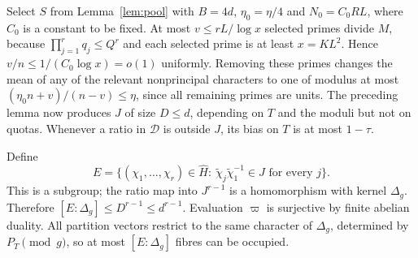 \documentclass[11pt]{article}
\theoremstyle{remark}\newtheorem{remark}[theorem]{Remark}
\begin{document}
Select $S$ from Lemma~\ref{lem:pool} with $B=4d$, $\eta_0=\eta/4$ and $N_0=C_0RL$, where $C_0$ is a constant to be fixed. At most $v\le r L/\log x$ selected primes divide $M$, because $\prod_{j=1}^r q_j\le Q^r$ and each selected prime is at least $x=KL^2$. Hence $v/n\le1/(C_0\log x)=o(1)$ uniformly. Removing these primes changes the mean of any of the relevant nonprincipal characters to one of modulus at most $(\eta_0 n+v)/(n-v)\le\eta$, since all remaining primes are units. The preceding lemma now produces $J$ of size $D\le d$, depending on $T$ and the moduli but not on quotas. Whenever a ratio in $\mathcal D$ is outside $J$, its bias on $T$ is at most $1-\tau$.

Define
\begin{equation}\label{eq:E}
E=\{(\chi_1,\ldots,\chi_r)\in\widehat H:\ 
\widetilde\chi_j\widetilde\chi_1^{-1}\in J\text{ for every }j\}.
\end{equation}
This is a subgroup; the ratio map into $J^{r-1}$ is a homomorphism with kernel $\Delta_g$. Therefore $[E:\Delta_g]\le D^{r-1}\le d^{r-1}$. Evaluation $\varpi$ is surjective by finite abelian duality. All partition vectors restrict to the same character of $\Delta_g$, determined by $P_T\pmod g$, so at most $[E:\Delta_g]$ fibres can be occupied.
\end{document}
